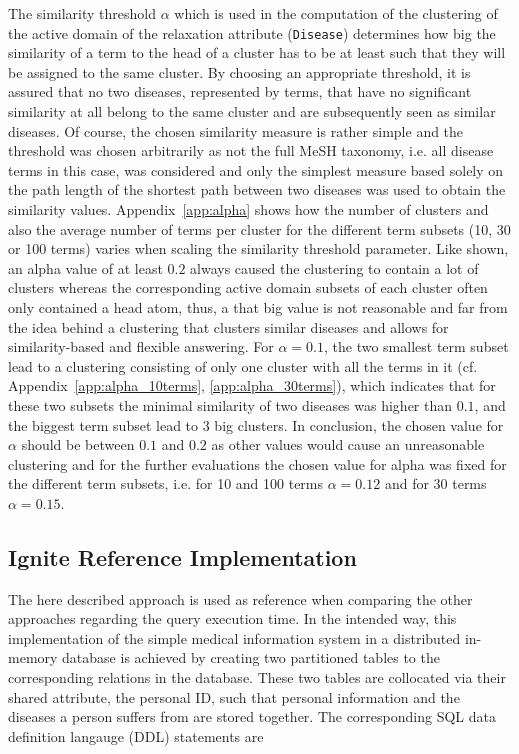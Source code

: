 The similarity threshold $\alpha$ which is used in the computation of the clustering of the active domain of the relaxation attribute (\verb!Disease!) 
determines how big the similarity of a term to the head of a cluster has to be at least such that they will be assigned to the same cluster. By choosing an
appropriate threshold, it is assured that no two diseases, represented by terms, that have no significant similarity at all belong to the same cluster and are 
subsequently seen as similar diseases. Of course, the chosen similarity measure is rather simple and the threshold was chosen arbitrarily as not the full
MeSH taxonomy, i.e. all disease terms in this case, was considered and only the simplest measure based solely on the path length of the shortest path between
two diseases was used to obtain the similarity values. Appendix~\ref{app:alpha} shows how the number of clusters and also the average number of terms per
cluster for the different term subsets (10, 30 or 100 terms) varies when scaling the similarity threshold parameter. Like shown, an alpha value of at least
$0.2$ always caused the clustering to contain a lot of clusters whereas the corresponding active domain subsets of each cluster often only contained a head
atom, thus, a that big value is not reasonable and far from the idea behind a clustering that clusters similar diseases and allows for similarity-based and
flexible answering. For $\alpha=0.1$, the two smallest term subset lead to a clustering consisting of only one cluster with all the terms in it 
(cf. Appendix~\ref{app:alpha_10terms}, \ref{app:alpha_30terms}), which indicates that for these two subsets the minimal similarity of two diseases was higher 
than $0.1$, and the biggest term subset lead to 3 big clusters. In conclusion, the chosen value for $\alpha$ should be between $0.1$ and $0.2$ as other values
would cause an unreasonable clustering and for the further evaluations the chosen value for alpha was fixed for the different term subsets, i.e. for 10 and 100
terms $\alpha=0.12$ and for 30 terms $\alpha=0.15$.


\subsection{Ignite Reference Implementation}
\label{sec:impl_refimpl}
The here described approach is used as reference when comparing the other approaches regarding the query execution time. In the intended way, this
implementation of the simple medical information system in a distributed in-memory  database is achieved by creating two partitioned tables
to the corresponding relations in the database. These two tables are collocated via their shared attribute, the personal ID, such that personal information and
the diseases a person suffers from are stored together. The corresponding SQL data definition langauge (DDL) statements are

